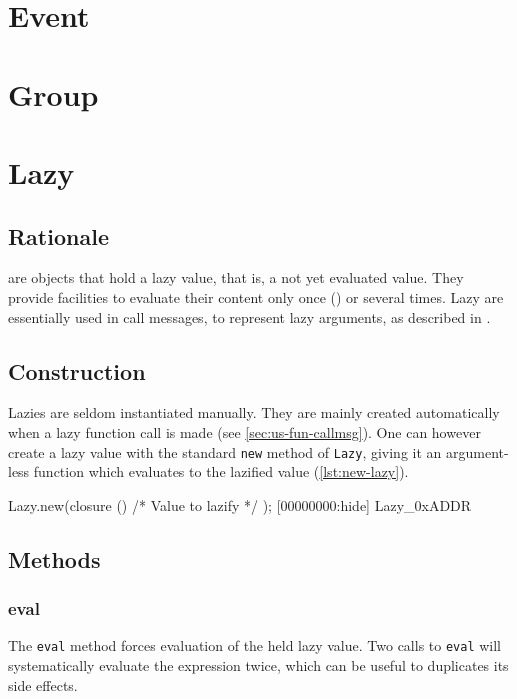 \section{Event}



\section{Group}

\section{Lazy}

\subsection{Rationale}

 are objects that hold a lazy value, that is, a not yet evaluated
value. They provide facilities to evaluate their content only once
() or several times. Lazy are essentially used in call
messages, to represent lazy arguments, as described in
.

\subsection{Construction}

Lazies are seldom instantiated manually. They are mainly created
automatically when a lazy function call is made (see
\autoref{sec:us-fun-callmsg}). One can however create a lazy value with the
standard \lstinline|new| method of \lstinline|Lazy|, giving it an
argument-less function which evaluates to the lazified value
(\autoref{lst:new-lazy}).

\begin{urbiscript}[caption=Creating a lazy value, label=lst:new-lazy,
  float=\floatpos]
Lazy.new(closure () { /* Value to lazify */ });
[00000000:hide] Lazy_0xADDR
\end{urbiscript}

\subsection{Methods}
\subsubsection{eval}

The \lstinline|eval| method forces evaluation of the held lazy
value. Two calls to \lstinline|eval| will systematically evaluate the
expression twice, which can be useful to duplicates its side effects.


